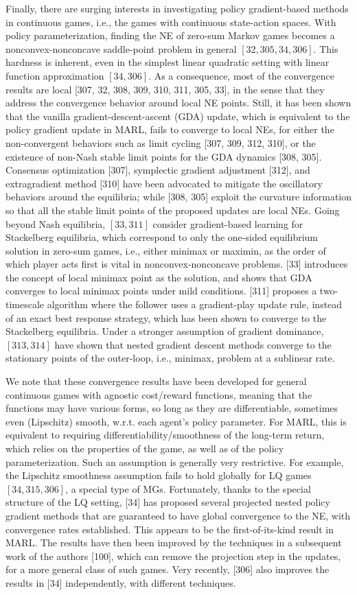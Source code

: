 \documentclass[10pt]{article}
\begin{document}
Finally, there are surging interests in investigating policy gradient-based methods in continuous games, i.e., the games with continuous state-action spaces. With policy parameterization, finding the NE of zero-sum Markov games becomes a nonconvex-nonconcave saddle-point problem in general $[32,305,34,306]$. This hardness is inherent, even in the simplest linear quadratic setting with linear function approximation $[34,306]$. As a consequence, most of the convergence results are local [307, 32, 308, 309, 310, 311, 305, 33], in the sense that they address the convergence behavior around local NE points. Still, it has been shown that the vanilla gradient-descent-ascent (GDA) update, which is equivalent to the policy gradient update in MARL, fails to converge to local NEs, for either the non-convergent behaviors such as limit cycling [307, 309, 312, 310], or the existence of non-Nash stable limit points for the GDA dynamics [308, 305]. Consensus optimization [307], symplectic gradient adjustment [312], and extragradient method [310] have been advocated to mitigate the oscillatory behaviors around the equilibria; while [308, 305] exploit the curvature information so that all the stable limit points of the proposed updates are local NEs. Going beyond Nash equilibria, $[33,311]$ consider gradient-based learning for Stackelberg equilibria, which correspond to only the one-sided equilibrium solution in zero-sum games, i.e., either minimax or maximin, as the order of which player acts first is vital in nonconvex-nonconcave problems. [33] introduces the concept of local minimax point as the solution, and shows that GDA converges to local minimax points under mild conditions. [311] proposes a two-timescale algorithm where the follower uses a gradient-play update rule, instead of an exact best response strategy, which has been shown to converge to the Stackelberg equilibria. Under a stronger assumption of gradient dominance, $[313,314]$ have shown that nested gradient descent methods converge to the stationary points of the outer-loop, i.e., minimax, problem at a sublinear rate.

We note that these convergence results have been developed for general continuous games with agnostic cost/reward functions, meaning that the functions may have various forms, so long as they are differentiable, sometimes even (Lipschitz) smooth, w.r.t. each agent's policy parameter. For MARL, this is equivalent to requiring differentiability/smoothness of the long-term return, which relies on the properties of the game, as well as of the policy parameterization. Such an assumption is generally very restrictive. For example, the Lipschitz smoothness assumption fails to hold globally for LQ games $[34,315,306]$, a special type of MGs. Fortunately, thanks to the special structure of the LQ setting, [34] has proposed several projected nested policy gradient methods that are guaranteed to have global convergence to the NE, with convergence rates established. This appears to be the first-of-its-kind result in MARL. The results have then been improved by the techniques in a subsequent work of the authors [100], which can remove the projection step in the updates, for a more general class of such games. Very recently, [306] also improves the results in [34] independently, with different techniques.
\end{document}
